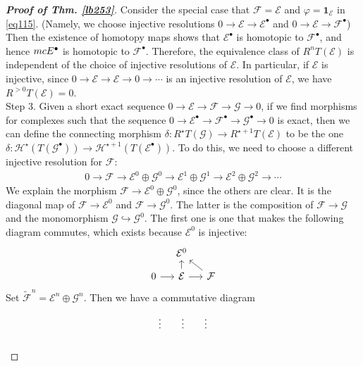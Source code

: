 \documentclass[12pt,b5paper,notitlepage]{report}
\theoremstyle{definition}
\theoremstyle{plain}
\newcommand{\mc}{\mathcal}
\newcommand{\wtd}{\widetilde}
\newcommand{\id}{\mathbf{1}}
\newcommand{\blt}{\bullet}
\numberwithin{equation}{section}
\begin{document}
\begin{proof}[\textbf{Proof of Thm. \ref{lb253}}]
Consider the special case that $\mc F=\mc E$ and $\varphi=\id_{\mc E}$ in \eqref{eq115}. (Namely, we choose injective resolutions $0\rightarrow\mc E\rightarrow\mc E^\blt$ and $0\rightarrow\mc E\rightarrow\mc F^\blt$) Then the existence of homotopy maps shows that $\mc E^\blt$ is homotopic to $\mc F^\blt$, and hence $\\mc E^\blt$ is homotopic to $\mc F^\blt$. Therefore, the equivalence class of $R^nT(\mc E)$ is independent of the choice of injective resolutions of $\mc E$. In particular, if $\mc E$ is injective, since $0\rightarrow\mc E\rightarrow\mc E\rightarrow0\rightarrow\cdots$ is an injective resolution of $\mc E$, we have $R^{>0}T(\mc E)=0$. \\

Step 3. Given a short exact sequence $0\rightarrow\mc E\rightarrow\mc F\rightarrow\mc G\rightarrow 0$, if we find morphisms for complexes such that the sequence $0\rightarrow\mc E^\blt\rightarrow\mc F^\blt\rightarrow\mc G^\blt\rightarrow0$ is exact, then we can define the connecting morphism $\delta:R^\star T(\mc G)\rightarrow R^{\star+1}T(\mc E)$ to be the one $\delta:\mc H^\star(T(\mc G^\blt))\rightarrow\mc H^{\star+1}(T(\mc E^\blt))$. To do this, we need to choose a different injective resolution for $\mc F$: 
\begin{align*}
0\rightarrow\mc F\rightarrow\mc E^0\oplus \mc G^0\rightarrow\mc E^1\oplus \mc G^1\rightarrow\mc E^2\oplus \mc G^2\rightarrow\cdots
\end{align*}
We explain the morphism $\mc F\rightarrow\mc E^0\oplus \mc G^0$, since the others are clear. It is the diagonal map of $\mc F\rightarrow\mc E^0$ and $\mc F\rightarrow\mc G^0$. The latter is the composition of $\mc F\rightarrow \mc G$ and the monomorphism $\mc G\hookrightarrow\mc G^0$. The first one is one that makes the following diagram commutes, which exists because $\mc E^0$ is injective:
\begin{equation*}
\begin{tikzcd}[sep=small]
            & \mc E^0                   &                  \\
0 \arrow[r] & \mc E \arrow[r] \arrow[u] & \mc F \arrow[lu]
\end{tikzcd}
\end{equation*}
Set $\wtd{\mc F}^n=\mc E^n\oplus\mc G^n$. Then we have a commutative diagram
\begin{equation*}
\begin{tikzcd}[row sep=0.15in, column sep=small]
            & \vdots                      & \vdots                            & \vdots                      &   \\

\end{tikzcd}
\end{equation*}
\end{proof}
\end{document}
